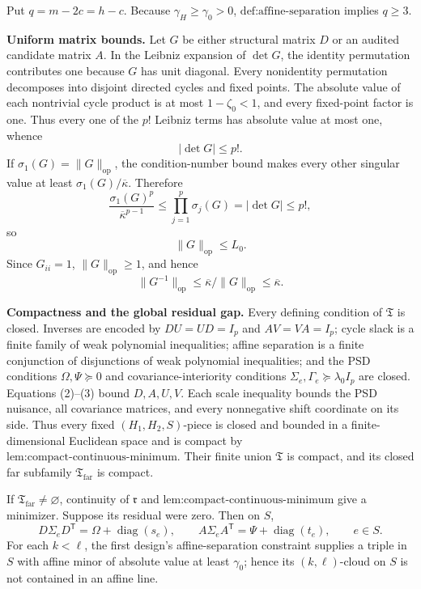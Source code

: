 Put \(q=m-2c=h-c\). Because \(\gamma_H\geq\gamma_0>0\), \(\text{def:affine-separation}\) implies \(q\geq3\).

\textbf{Uniform matrix bounds.} Let \(G\) be either structural matrix \(D\) or an audited candidate matrix \(A\). In the Leibniz expansion of \(\det G\), the identity permutation contributes one because \(G\) has unit diagonal. Every nonidentity permutation decomposes into disjoint directed cycles and fixed points. The absolute value of each nontrivial cycle product is at most \(1-\zeta_0<1\), and every fixed-point factor is one. Thus every one of the \(p!\) Leibniz terms has absolute value at most one, whence
\[
|\det G|\leq p!.
\tag{1}
\]
If \(\sigma_1(G)=\|G\|_{\mathrm{op}}\), the condition-number bound makes every other singular value at least \(\sigma_1(G)/\overline\kappa\). Therefore
\[
\frac{\sigma_1(G)^p}{\overline\kappa^{p-1}}
\leq\prod_{j=1}^p\sigma_j(G)=|\det G|\leq p!,
\]
so
\[
\|G\|_{\mathrm{op}}\leq L_0.
\tag{2}
\]
Since \(G_{ii}=1\), \(\|G\|_{\mathrm{op}}\geq1\), and hence
\[
\|G^{-1}\|_{\mathrm{op}}
\leq\overline\kappa/\|G\|_{\mathrm{op}}
\leq\overline\kappa.
\tag{3}
\]

\textbf{Compactness and the global residual gap.} Every defining condition of \(\mathfrak T\) is closed. Inverses are encoded by \(DU=UD=I_p\) and \(AV=VA=I_p\); cycle slack is a finite family of weak polynomial inequalities; affine separation is a finite conjunction of disjunctions of weak polynomial inequalities; and the PSD conditions \(\Omega,\Psi\succeq0\) and covariance-interiority conditions \(\Sigma_e,\Gamma_e\succeq\lambda_0I_p\) are closed. Equations (2)--(3) bound \(D,A,U,V\). Each scale inequality bounds the PSD nuisance, all covariance matrices, and every nonnegative shift coordinate on its side. Thus every fixed \((H_1,H_2,S)\)-piece is closed and bounded in a finite-dimensional Euclidean space and is compact by \(\text{lem:compact-continuous-minimum}\). Their finite union \(\mathfrak T\) is compact, and its closed far subfamily \(\mathfrak T_{\mathrm{far}}\) is compact.

If \(\mathfrak T_{\mathrm{far}}\neq\varnothing\), continuity of \(\mathfrak r\) and \(\text{lem:compact-continuous-minimum}\) give a minimizer. Suppose its residual were zero. Then on \(S\),
\[
D\Sigma_eD^{\mathsf T}=\Omega+\operatorname{diag}(s_e),
\qquad
A\Sigma_eA^{\mathsf T}=\Psi+\operatorname{diag}(t_e),
\qquad e\in S.
\tag{4}
\]
For each \(k<\ell\), the first design's affine-separation constraint supplies a triple in \(S\) with affine minor of absolute value at least \(\gamma_0\); hence its \((k,\ell)\)-cloud on \(S\) is not contained in an affine line.

